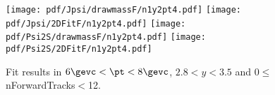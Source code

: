 \begin{figure}[H]
\begin{center}
\texttt{[image: pdf/Jpsi/drawmassF/n1y2pt4.pdf]}
\texttt{[image: pdf/Jpsi/2DFitF/n1y2pt4.pdf]}
\vspace*{-0.5cm}
\texttt{[image: pdf/Psi2S/drawmassF/n1y2pt4.pdf]}
\texttt{[image: pdf/Psi2S/2DFitF/n1y2pt4.pdf]}
\vspace*{-0.5cm}
\end{center}
\caption{Fit results in $6\gevc<\pt<8\gevc$, $2.8<y<3.5$ and 0$\leq$nForwardTracks$<$12.}
\label{Fitn1y2pt4}
\end{figure}

